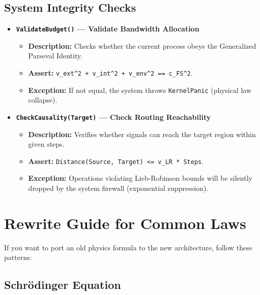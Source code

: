 \documentclass[11pt,a4paper,twoside]{book}
\begin{document}
\subsection{System Integrity Checks}

\begin{itemize}
\item \textbf{\texttt{ValidateBudget()} --- Validate Bandwidth Allocation}

\begin{itemize}
\item \textbf{Description:} Checks whether the current process obeys the Generalized Parseval Identity.

\item \textbf{Assert:} \texttt{v\_ext\^{}2 + v\_int\^{}2 + v\_env\^{}2 == c\_FS\^{}2}.

\item \textbf{Exception:} If not equal, the system throws \texttt{KernelPanic} (physical law collapse).
\end{itemize}

\item \textbf{\texttt{CheckCausality(Target)} --- Check Routing Reachability}

\begin{itemize}
\item \textbf{Description:} Verifies whether signals can reach the target region within given steps.

\item \textbf{Assert:} \texttt{Distance(Source, Target) <= v\_LR * Steps}.

\item \textbf{Exception:} Operations violating Lieb-Robinson bounds will be silently dropped by the system firewall (exponential suppression).
\end{itemize}
\end{itemize}

\section{Rewrite Guide for Common Laws}

If you want to port an old physics formula to the new architecture, follow these patterns:

\subsection{Schrödinger Equation}
\end{document}
